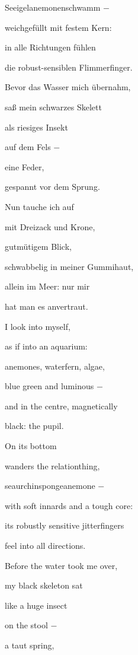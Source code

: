 \documentclass[a4paper]{article}
\begin{document}
Seeigelanemonenschwamm $-$

weichgefüllt mit festem Kern:

in alle Richtungen fühlen

die robust-sensiblen Flimmerfinger.


\bigskip

Bevor das Wasser mich übernahm,

saß mein schwarzes Skelett

als riesiges Insekt

auf dem Fels $-$ 

eine Feder,

gespannt vor dem Sprung.


\bigskip

Nun tauche ich auf

mit Dreizack und Krone,

gutmütigem Blick,

schwabbelig in meiner Gummihaut,

allein im Meer: nur mir

hat man es anvertraut.


\bigskip


\bigskip



\bigskip

I look into myself,

as if into an aquarium:

anemones, waterfern, algae,

blue green and luminous $-$

and in the centre, magnetically

black: the pupil.


\bigskip

On its bottom 

wanders the relationthing,

seaurchinspongeanemone $-$

with soft innards and a tough core:

its robustly sensitive jitterfingers

feel into all directions.


\bigskip

Before the water took me over,

my black skeleton sat

like a huge insect

on the stool $-$

a taut spring,
\end{document}
